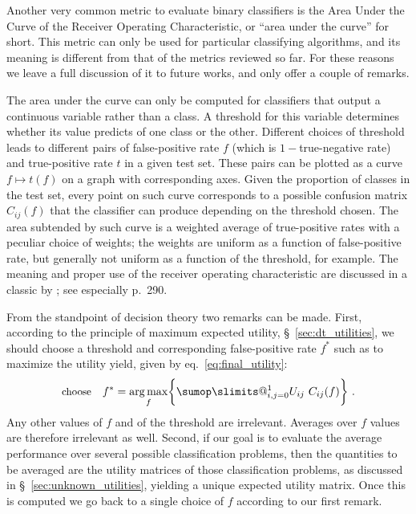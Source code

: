 \documentclass[\ifafour a4paper,12pt,\else a5paper,10pt,\fi%
onecolumn,oneside,article,%
british%
]{memoir}
\makeatletter
\theoremstyle{remark}
\theoremstyle{innote}
\def\sum{\DOTSI\sumop\slimits@}
\DeclarePairedDelimiter\set{\{}{\}} %
\renewcommand*{\|}[1][]{\nonscript\:#1\vert\nonscript\:\mathopen{}}
\newcommand*{\sect}{\S}%
\newcommand*{\eqn}{eq.}%
\DeclareMathOperator*{\argmax}{arg\,max}
\makeatother
\begin{document}
Another very common metric to evaluate binary classifiers is the Area Under the Curve of the Receiver Operating Characteristic, or \enquote{area under the curve} for short. This metric can only be used for particular classifying algorithms, and its meaning is different from that of the metrics reviewed so far. For these reasons we leave a full discussion of it to future works, and only offer a couple of remarks.

The area under the curve can only be computed for classifiers that output a continuous variable rather than a class. A threshold for this variable determines whether its value predicts of one class or the other. Different choices of threshold leads to different pairs of false-positive rate $f$ (which is $1-{}$true-negative rate) and true-positive rate $t$ in a given test set. These pairs can be plotted as a curve $f \mapsto t(f)$ on a graph with corresponding axes. Given the proportion of classes in the test set, every point on such curve corresponds to a possible confusion matrix $C_{ij}(f)$ that the classifier can produce depending on the threshold chosen. The area subtended by such curve is a weighted average of true-positive rates with a peculiar choice of weights; the weights are uniform as a function of false-positive rate, but generally not uniform as a function of the threshold, for example. The meaning and proper use of the receiver operating characteristic are discussed in a classic by \cites{metz1978}; see especially p.~290.


\medskip

From the standpoint of decision theory two remarks can be made\autocites[similar points are made by][]{bakeretal2001,loboetal2008}. First, according to the principle of maximum expected utility, \sect~\ref{sec:dt_utilities}, we should choose a threshold and corresponding false-positive rate $f^{*}$ such as to maximize the utility yield, given by \eqn~\eqref{eq:final_utility}:
\begin{equation}
  \label{eq:threshold_auc_maxutility}
  \text{\small choose}\quad
  f^{*} = \argmax_{f}\set[\bigg]{\sum_{i,j=0}^{1} U_{ij}\ C_{ij}(f)} \ .
\end{equation}
Any other values of $f$ and of the threshold are irrelevant. Averages over $f$ values are therefore irrelevant as well. Second, if our goal is to evaluate the average performance over several possible classification problems, then the quantities to be averaged are the utility matrices of those classification problems, as discussed in \sect~\ref{sec:unknown_utilities}, yielding a unique expected utility matrix. Once this is computed we go back to a single choice of $f$ according to our first remark.
\end{document}
